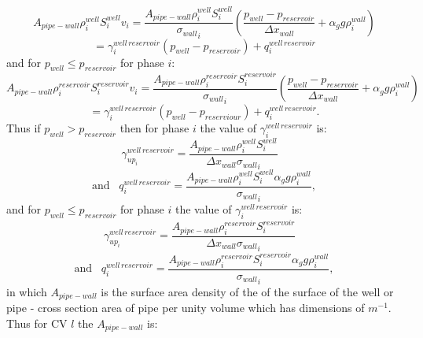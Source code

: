 \begin{equation}
A_{pipe-wall} \rho_i^{well} S_i^{well} v_i = \frac{A_{pipe-wall} \rho_i^{well} S_i^{well} }{{\sigma_{wall}}_i} 
\left( \frac{ p_{well} - p_{reservoir} }{{\Delta x}_{wall}}  +\alpha_g g \rho_i^{wall}  \right)
\end{equation}
\begin{equation}
=\gamma_i^{well\, reservoir} (p_{well} - p_{reservoir}) + q_i^{well\, reservoir}
\label{saturation_wells_9}
\end{equation}
and for $p_{well}\leq p_{reservoir}$ for phase $i$: 
\begin{equation}
A_{pipe-wall}  \rho_i^{reservoir} S_i^{reservoir} v_i = \frac{A_{pipe-wall}  \rho_i^{reservoir} S_i^{reservoir} }{{\sigma_{wall}}_i} \left(\frac{ p_{well} - p_{reservoir} }{{\Delta x}_{wall}} +\alpha_g g \rho_i^{wall}\right)
\end{equation}
\begin{equation}
=\gamma_i^{well\, reservoir} (p_{well} - p_{reserviour}) + q_i^{well\, reservoir}. 
\label{saturation_wells_10}
\end{equation}
Thus if $p_{well}>p_{reservoir}$ then for phase $i$ the value of $\gamma_i^{well\, reservoir}$ is: 
\begin{equation}
\gamma_{up_i}^{well\, reservoir}=\frac{A_{pipe-wall}  \rho_i^{well} S_i^{well} }{{{\Delta x}_{wall}\sigma_{wall}}_i} 
\;\;\;
\end{equation}
\begin{equation}
\text{and} 
\;\;\;
q_{i}^{well\, reservoir}=\frac{A_{pipe-wall}  \rho_i^{well} S_i^{well} \alpha_g g \rho_i^{wall}    }
{{\sigma_{wall}}_i} ,
\label{saturation_wells_11}
\end{equation}
and for $p_{well}\leq p_{reservoir}$ for phase $i$ the value of $\gamma_i^{well\, reservoir}$ is:
\begin{equation}
\gamma_{up_i}^{well\, reservoir}=\frac{A_{pipe-wall}  \rho_i^{reservoir} S_i^{reservoir}   }
{{\Delta x}_{wall}{\sigma_{wall}}_i} 
\;\;\;
\label{saturation_wells_12-gamma}
\end{equation}
\begin{equation}
\text{and} 
\;\;\;
q_{i}^{well\, reservoir}=\frac{A_{pipe-wall}  \rho_i^{reservoir} S_i^{reservoir} \alpha_g g \rho_i^{wall}}
{{\sigma_{wall}}_i} ,
\label{saturation_wells_12}
\end{equation}
in which $A_{pipe-wall}$ is the surface area density of the of the surface of the well or pipe - cross section area of pipe per unity volume which has dimensions of $m^{-1}$. Thus for CV $l$ the $A_{pipe-wall}$ is:

